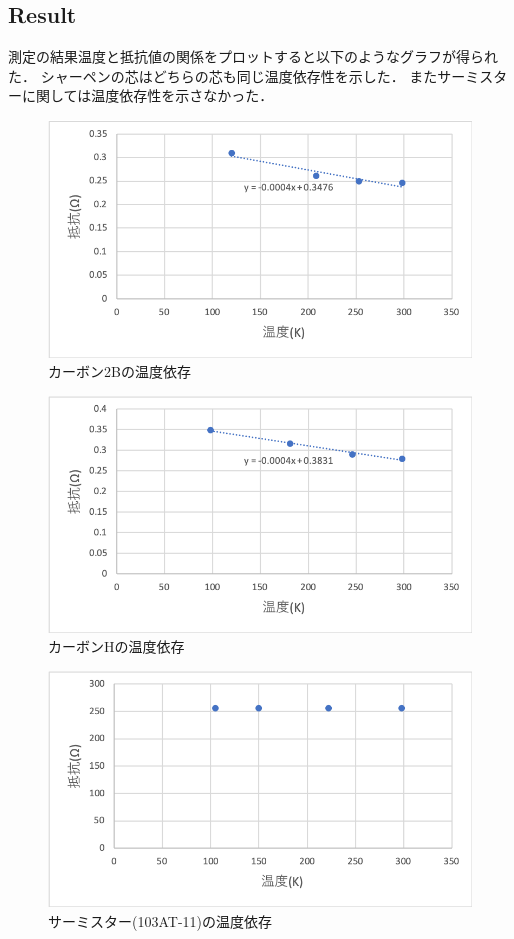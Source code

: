 \documentclass[11pt, a4paper,twocolumn]{jarticle}
\begin{document}
\subsection{Result}
測定の結果温度と抵抗値の関係をプロットすると以下のようなグラフが得られた．
シャーペンの芯はどちらの芯も同じ温度依存性を示した．
またサーミスターに関しては温度依存性を示さなかった．

\begin{figure}[htbp]
 \begin{center}
  \includegraphics[width=0.8\linewidth]{fig33.png}
 \end{center}
 \caption{カーボン2Bの温度依存}
 \label{fig:33}
\end{figure}

\begin{figure}[htbp]
 \begin{center}
  \includegraphics[width=0.8\linewidth]{fig34.png}
 \end{center}
 \caption{カーボンHの温度依存}
 \label{fig:34}
\end{figure}

\begin{figure}[htbp]
 \begin{center}
  \includegraphics[width=0.8\linewidth]{fig35.png}
 \end{center}
 \caption{サーミスター(103AT-11)の温度依存}
 \label{fig:35}
\end{figure}
\end{document}
